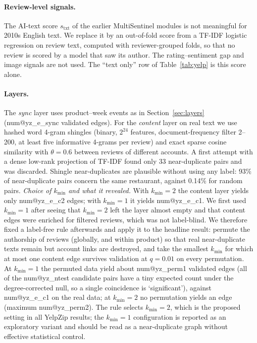 \documentclass[pdflatex,sn-basic]{sn-jnl}
\makeatletter
\theoremstyle{thmstyleone}
\theoremstyle{thmstylethree}
\newcommand{\num}[1]{\csname num@#1\endcsname}
\makeatother
\begin{document}
\paragraph{Review-level signals.} The AI-text score $s_{\mathrm{txt}}$ of the earlier MultiSentinel modules is not meaningful for 2010s English text. We replace it by an out-of-fold score from a TF-IDF logistic regression on review text, computed with reviewer-grouped folds, so that no review is scored by a model that saw its author. The rating--sentiment gap and image signals are not used. The ``text only'' row of Table~\ref{tab:yelp} is this score alone.

\paragraph{Layers.} The \emph{sync} layer uses product--week events as in Section~\ref{sec:layers} (\num{yz_e_sync} validated edges). For the \emph{content} layer on real text we use hashed word 4-gram shingles (binary, $2^{24}$ features, document-frequency filter 2--200, at least five informative 4-grams per review) and exact sparse cosine similarity with $\theta=0.6$ between reviews of different accounts. A first attempt with a dense low-rank projection of TF-IDF found only 33 near-duplicate pairs and was discarded. Shingle near-duplicates are plausible without using any label: 93\% of near-duplicate pairs concern the same restaurant, against 0.14\% for random pairs. \emph{Choice of $k_{\min}$ and what it revealed.} With $k_{\min}=2$ the content layer yields only \num{yz_e_c2} edges; with $k_{\min}=1$ it yields \num{yz_e_c1}. We first used $k_{\min}=1$ after seeing that $k_{\min}=2$ left the layer almost empty and that content edges were enriched for filtered reviews, which was not label-blind. We therefore fixed a label-free rule afterwards and apply it to the headline result: permute the authorship of reviews (globally, and within product) so that real near-duplicate texts remain but account links are destroyed, and take the smallest $k_{\min}$ for which at most one content edge survives validation at $q=0.01$ on every permutation. At $k_{\min}=1$ the permuted data yield about \num{yz_perm1} validated edges (all of the \num{yz_ntest} candidate pairs have a tiny expected count under the degree-corrected null, so a single coincidence is `significant'), against \num{yz_e_c1} on the real data; at $k_{\min}=2$ no permutation yields an edge (maximum \num{yz_perm2}). The rule selects $k_{\min}=2$, which is the proposed setting in all YelpZip results; the $k_{\min}=1$ configuration is reported as an exploratory variant and should be read as a near-duplicate graph without effective statistical control.
\end{document}
